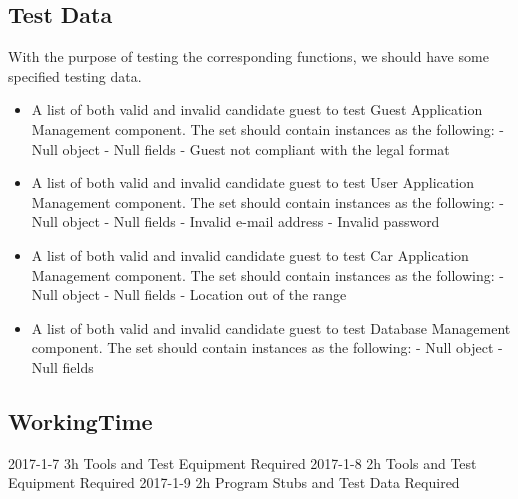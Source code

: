 \documentclass{article}
\begin{document}
	\subsection{Test Data}
	With the purpose of testing the corresponding functions, we should have some specified testing data.
		\begin{itemize}
			
			\item A list of both valid and invalid candidate guest to test Guest Application Management component. The set should contain instances as the following:
			\newline
			\newline - Null object
			\newline - Null fields
			\newline - Guest not compliant with the legal format
			
			\item A list of both valid and invalid candidate guest to test User Application Management component. The set should contain instances as the following:
			\newline
			\newline - Null object
			\newline - Null fields
			\newline - Invalid e-mail address
			\newline - Invalid password
			
			\item A list of both valid and invalid candidate guest to test Car Application Management component. The set should contain instances as the following:
			\newline
			\newline - Null object
			\newline - Null fields
			\newline - Location out of the range
			
			\item A list of both valid and invalid candidate guest to test Database Management component. The set should contain instances as the following:
			\newline
			\newline - Null object
			\newline - Null fields
			
		\end{itemize}
	
	\newpage
	
	\subsection{WorkingTime}
	2017-1-7 3h Tools and Test Equipment Required
	2017-1-8 2h Tools and Test Equipment Required
	2017-1-9 2h Program Stubs and Test Data Required
	
\end{document}
